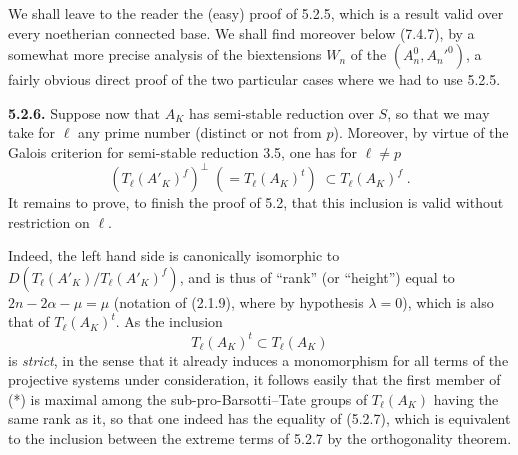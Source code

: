 \documentclass[11pt]{article}
\newcommand{\Tl}{T_{\ell}}
\begin{document}
We shall leave to the reader the (easy) proof of 5.2.5, which is a
result valid over every noetherian connected base. We shall find
moreover below (7.4.7), by a somewhat more precise analysis of the
biextensions $W_n$ of the $(A_n^0, A_n'^0)$, a fairly obvious direct
proof of the two particular cases where we had to use 5.2.5.


\medskip

\noindent\textbf{5.2.6.} Suppose now that $A_K$ has semi-stable reduction
over $S$, so that we may take for $\ell$ any prime number (distinct or
not from $p$). Moreover, by virtue of the Galois criterion for
semi-stable reduction 3.5, one has for $\ell \neq p$
\begin{equation}
(\Tl(A'_K)^f)^{\perp} \;(= \Tl(A_K)^t)\; \subset \Tl(A_K)^f \; .
\end{equation}
It remains to prove, to finish the proof of 5.2, that this inclusion is
valid without restriction on $\ell$.

Indeed, the left hand side is canonically isomorphic to
$D(\Tl(A'_K)/\Tl(A'_K)^f)$, and is thus of ``rank'' (or ``height'')
equal to $2n - 2\alpha - \mu = \mu$ (notation of (2.1.9), where by
hypothesis $\lambda = 0$), which is also that of $\Tl(A_K)^t$. As the
inclusion
\[
\Tl(A_K)^t \subset \Tl(A_K)
\]
is \emph{strict}, in the sense that it already induces a monomorphism
for all terms of the projective systems under consideration, it follows
easily that the first member of (*) is maximal among the
sub-pro-Barsotti--Tate groups of $\Tl(A_K)$ having the same rank as it,
so that one indeed has the equality of (5.2.7), which is equivalent to
the inclusion between the extreme terms of 5.2.7 by the orthogonality
theorem.

\medskip
\end{document}
